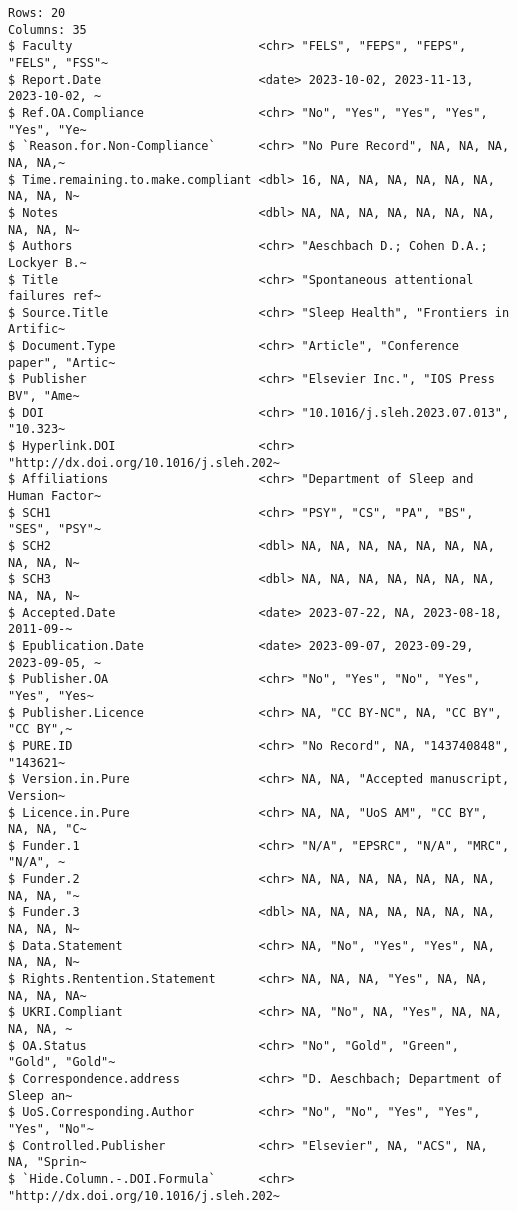 \documentclass[
  letterpaper,
  DIV=11,
  numbers=noendperiod]{scrreprt}
\begin{document}
\begin{verbatim}
Rows: 20
Columns: 35
$ Faculty                          <chr> "FELS", "FEPS", "FEPS", "FELS", "FSS"~
$ Report.Date                      <date> 2023-10-02, 2023-11-13, 2023-10-02, ~
$ Ref.OA.Compliance                <chr> "No", "Yes", "Yes", "Yes", "Yes", "Ye~
$ `Reason.for.Non-Compliance`      <chr> "No Pure Record", NA, NA, NA, NA, NA,~
$ Time.remaining.to.make.compliant <dbl> 16, NA, NA, NA, NA, NA, NA, NA, NA, N~
$ Notes                            <dbl> NA, NA, NA, NA, NA, NA, NA, NA, NA, N~
$ Authors                          <chr> "Aeschbach D.; Cohen D.A.; Lockyer B.~
$ Title                            <chr> "Spontaneous attentional failures ref~
$ Source.Title                     <chr> "Sleep Health", "Frontiers in Artific~
$ Document.Type                    <chr> "Article", "Conference paper", "Artic~
$ Publisher                        <chr> "Elsevier Inc.", "IOS Press BV", "Ame~
$ DOI                              <chr> "10.1016/j.sleh.2023.07.013", "10.323~
$ Hyperlink.DOI                    <chr> "http://dx.doi.org/10.1016/j.sleh.202~
$ Affiliations                     <chr> "Department of Sleep and Human Factor~
$ SCH1                             <chr> "PSY", "CS", "PA", "BS", "SES", "PSY"~
$ SCH2                             <dbl> NA, NA, NA, NA, NA, NA, NA, NA, NA, N~
$ SCH3                             <dbl> NA, NA, NA, NA, NA, NA, NA, NA, NA, N~
$ Accepted.Date                    <date> 2023-07-22, NA, 2023-08-18, 2011-09-~
$ Epublication.Date                <date> 2023-09-07, 2023-09-29, 2023-09-05, ~
$ Publisher.OA                     <chr> "No", "Yes", "No", "Yes", "Yes", "Yes~
$ Publisher.Licence                <chr> NA, "CC BY-NC", NA, "CC BY", "CC BY",~
$ PURE.ID                          <chr> "No Record", NA, "143740848", "143621~
$ Version.in.Pure                  <chr> NA, NA, "Accepted manuscript, Version~
$ Licence.in.Pure                  <chr> NA, NA, "UoS AM", "CC BY", NA, NA, "C~
$ Funder.1                         <chr> "N/A", "EPSRC", "N/A", "MRC", "N/A", ~
$ Funder.2                         <chr> NA, NA, NA, NA, NA, NA, NA, NA, NA, "~
$ Funder.3                         <dbl> NA, NA, NA, NA, NA, NA, NA, NA, NA, N~
$ Data.Statement                   <chr> NA, "No", "Yes", "Yes", NA, NA, NA, N~
$ Rights.Rentention.Statement      <chr> NA, NA, NA, "Yes", NA, NA, NA, NA, NA~
$ UKRI.Compliant                   <chr> NA, "No", NA, "Yes", NA, NA, NA, NA, ~
$ OA.Status                        <chr> "No", "Gold", "Green", "Gold", "Gold"~
$ Correspondence.address           <chr> "D. Aeschbach; Department of Sleep an~
$ UoS.Corresponding.Author         <chr> "No", "No", "Yes", "Yes", "Yes", "No"~
$ Controlled.Publisher             <chr> "Elsevier", NA, "ACS", NA, NA, "Sprin~
$ `Hide.Column.-.DOI.Formula`      <chr> "http://dx.doi.org/10.1016/j.sleh.202~
\end{verbatim}
\end{document}
